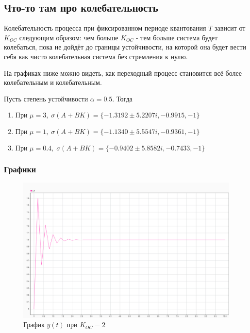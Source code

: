 
\subsection{Что-то там про колебательность}

Колебательность процесса при фиксированном периоде квантования $T$ зависит от $K_{OC}$ следующим образом: чем больше $K_{OC}$ - тем больше система будет колебаться, пока не дойдёт до границы устойчивости, на которой она будет вести себя как чисто колебательная система без стремления к нулю.

На графиках ниже можно видеть, как переходный процесс становится всё более колебательным и колебательным. 

Пусть степень устойчивости $\alpha = 0.5$. Тогда

\begin{enumerate}
    \item При $\mu = 3, \; \sigma(A+BK) = \{  -1.3192 \pm 5.2207i,  -0.9915, -1\}$
    \item При $\mu = 1, \; \sigma(A+BK) = \{  -1.1340 \pm 5.5547i,  -0.9361, -1\}$
    \item При $\mu = 0.4, \; \sigma(A+BK) = \{  -0.9402 \pm 5.8582i,  -0.7433, -1\}$
\end{enumerate}


\subsubsection{Графики}

\begin{figure}[H]
    \centering
\includegraphics[width=1.\linewidth,center]{assets/images/example1/2.png}
    \caption{График $y(t)$ при $K_{OC} = 2$}
    \label{fig:p2}
\end{figure}


